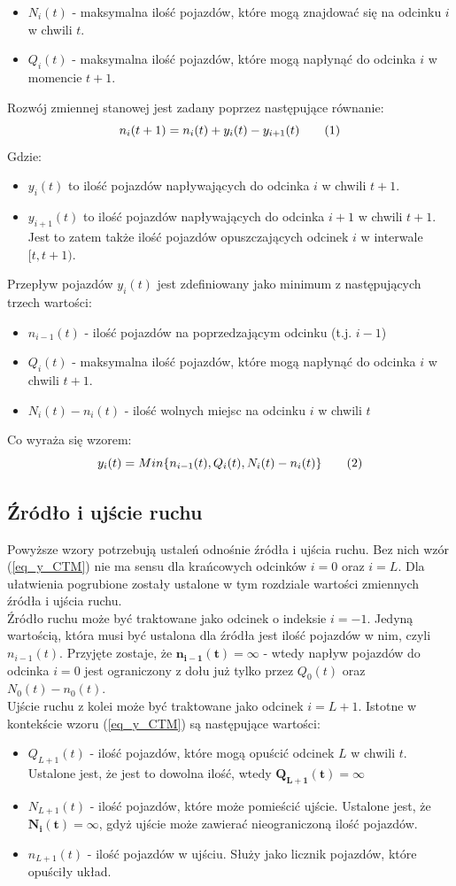 \documentclass[12pt]{book}
\theoremstyle{plain}
\newcommand\addtag{\refstepcounter{equation}
\renewcommand{\labelenumii}{\theenumii}
\renewcommand{\theenumii}{\theenumi.\arabic{enumii}.}
\tag{\theequation}}
\newcommand{\myref}[1]{(\ref{#1})}
\begin{document}
\begin{itemize}
	\item $N_i(t)$ - maksymalna ilość pojazdów, które mogą znajdować się na odcinku $i$ w chwili $t$.
	\item $Q_i(t)$ - maksymalna ilość pojazdów, które mogą napłynąć do odcinka $i$ w momencie $t+1$.
\end{itemize}
Rozwój zmiennej stanowej jest zadany poprzez następujące równanie:
\[n_i(t+1)=n_i(t)+y_i(t)-y_{i+1}(t) \addtag \]
Gdzie:
\begin{itemize}
	\item $y_i(t)$ to ilość pojazdów napływających do odcinka $i$ w chwili $t+1$.
	\item $y_{i+1}(t)$ to ilość pojazdów napływających do odcinka $i+1$ w chwili $t+1$. Jest to zatem także ilość pojazdów opuszczających odcinek $i$ w interwale $[t,t+1)$.
\end{itemize}
Przepływ pojazdów $y_i(t)$ jest zdefiniowany jako minimum z następujących trzech wartości:
\begin{itemize}
	\item $ n_{i-1}(t) $ - ilość pojazdów na poprzedzającym odcinku (t.j. $i-1$)
	\item $ Q_i(t) $ - maksymalna ilość pojazdów, które mogą napłynąć do odcinka $i$ w chwili $t+1$.
	\item $ N_i(t)-n_i(t) $ - ilość wolnych miejsc na odcinku $i$ w chwili $t$
\end{itemize}
Co wyraża się wzorem:
\[
y_i(t)=Min\{n_{i-1}(t),Q_i(t),N_i(t)-n_i(t)\} \addtag \label{eq_y_CTM}
\]
\subsection*{Źródło i ujście ruchu}
Powyższe wzory potrzebują ustaleń odnośnie źródła i ujścia ruchu. Bez nich wzór \myref{eq_y_CTM} nie ma sensu dla krańcowych odcinków $i=0$ oraz $i=L$. Dla ułatwienia pogrubione zostały ustalone w tym rozdziale wartości zmiennych źródła i ujścia ruchu. \\ Źródło ruchu może być traktowane jako odcinek o indeksie $i=-1$. Jedyną wartością, która musi być ustalona dla źródła jest ilość pojazdów w nim, czyli $n_{i-1}(t)$. Przyjęte zostaje, że $\mathbf{n_{i-1}(t)=\infty}$ - wtedy napływ pojazdów do odcinka $i=0$ jest ograniczony z dołu już tylko przez $Q_0(t)$ oraz $N_0(t)-n_0(t)$.
\\
Ujście ruchu z kolei może być traktowane jako odcinek $i=L+1$. Istotne w kontekście wzoru \myref{eq_y_CTM} są następujące wartości:
\begin{itemize}
	\item $Q_{L+1}(t)$ - ilość pojazdów, które mogą opuścić odcinek $L$ w chwili $t$. Ustalone jest, że jest to dowolna ilość, wtedy $\mathbf{Q_{L+1}(t)=\infty}$
	\item $N_{L+1}(t)$ - ilość pojazdów, które może pomieścić ujście. Ustalone jest, że $\mathbf{N_{i}(t)=\infty}$, gdyż ujście może zawierać nieograniczoną ilość pojazdów.
	\item $n_{L+1}(t)$ - ilość pojazdów w ujściu. Służy jako licznik pojazdów, które opuściły układ.
\end{itemize}
\end{document}
